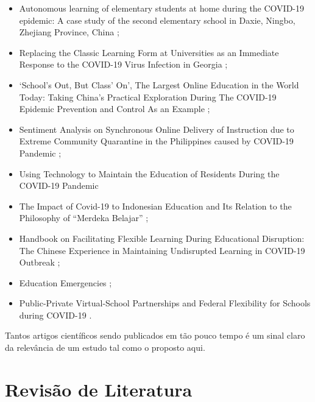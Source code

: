 \documentclass[
	arial,
	12pt,				%
	openright,			%
	oneside,
	a4paper,			%
	chapter=TITLE,		%
	english,			%
	french,				%
	spanish,			%
	brazil,				%
	]{abntex2}
\begin{document}
\begin{itemize}

  \item Autonomous learning of elementary students at home during the COVID-19 epidemic: A case study of the second elementary school in Daxie, Ningbo, Zhejiang Province, China \cite{xie2020autonomous};
  \item Replacing the Classic Learning Form at Universities as an Immediate Response to the COVID-19 Virus Infection in Georgia \cite{georgia};
  \item `School’s Out, But Class’ On', The Largest Online Education in the World Today: Taking China’s Practical Exploration During The COVID-19 Epidemic Prevention and Control As an Example \cite{zhou2020school};
  \item Sentiment Analysis on Synchronous Online Delivery of Instruction due to Extreme Community Quarantine in the Philippines caused by COVID-19 Pandemic \cite{pastor2020sentiment};
  \item Using Technology to Maintain the Education of Residents During the COVID-19 Pandemic \cite{chick2020using}
  \item The Impact of Covid-19 to Indonesian Education and Its Relation to the Philosophy of “Merdeka Belajar” \cite{abidah2020impact};
  \item Handbook on Facilitating Flexible Learning During Educational Disruption: The Chinese Experience in Maintaining Undisrupted Learning in COVID-19 Outbreak \cite{huang2020handbook};
  \item Education Emergencies \cite{unesco};
  \item Public-Private Virtual-School Partnerships and Federal Flexibility for Schools during COVID-19 \cite{butcher2020public}.

\end{itemize}

Tantos artigos científicos sendo publicados em tão pouco tempo é um sinal claro da relevância de um estudo tal como o proposto aqui. 

\chapter{Revisão de Literatura}
\end{document}
